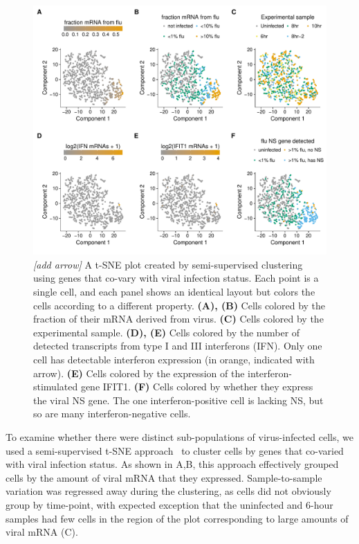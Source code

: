 \documentclass[9pt,lineno]{elife}
\newcommand{\jdbcomment}[1]{\emph{\color{red} [#1]}}
\begin{document}
\begin{figure}
\centerline{\includegraphics[width=0.9\linewidth]{figures/p_small_tsne_merge.pdf}}
\caption{\label{fig:tsne}
\jdbcomment{add arrow}
A t-SNE plot created by semi-supervised clustering using genes that co-vary with viral infection status.
Each point is a single cell, and each panel shows an identical layout but colors the cells according to a different property.
{\bf (A), (B)}
Cells colored by the fraction of their mRNA derived from virus.
{\bf (C)}
Cells colored by the experimental sample.
{\bf (D), (E)}
Cells colored by the number of detected transcripts from type I and III interferons (IFN).
Only one cell has detectable interferon expression (in orange, indicated with arrow).
{\bf (E)}
Cells colored by the expression of the interferon-stimulated gene IFIT1.
{\bf (F)}
Cells colored by whether they express the viral NS gene.
The one interferon-positive cell is lacking NS, but so are many interferon-negative cells.
}
\end{figure}

To examine whether there were distinct sub-populations of virus-infected cells, we used a semi-supervised t-SNE approach~\citep{VanderMaaten:2008tm} to cluster cells by genes that co-varied with viral infection status.
As shown in A,B, this approach effectively grouped cells by the amount of viral mRNA that they expressed.
Sample-to-sample variation was regressed away during the clustering, as cells did not obviously group by time-point, with expected exception that the uninfected and 6-hour samples had few cells in the region of the plot corresponding to large amounts of viral mRNA (C).
\end{document}
